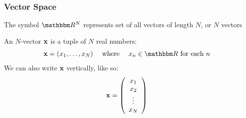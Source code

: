 \begin{frame}
    \frametitle{Vector Space}
    
    \vspace{2em}
    The symbol $\RR^N$ represents set of all vectors of length $N$, or $N$ vectors 

    \vspace{.7em}

    An $N$-vector ${\mathbf x}$ is a tuple of $N$ real numbers:
    $$
    \boldx = (x_1, \ldots, x_N)
        \quad
        \text{ where } 
        \quad x_n \in \RR \text{ for each } n
    $$  
    \vspace{1em}
    We can also write ${\mathbf x}$ vertically, like so: 
    \begin{equation*}
        {\mathbf x} = 
        \left(
        \begin{array}{c}
            x_1 \\
            x_2 \\
            \vdots \\
            x_N
        \end{array}
        \right)
    \end{equation*}
    
\end{frame}

    




